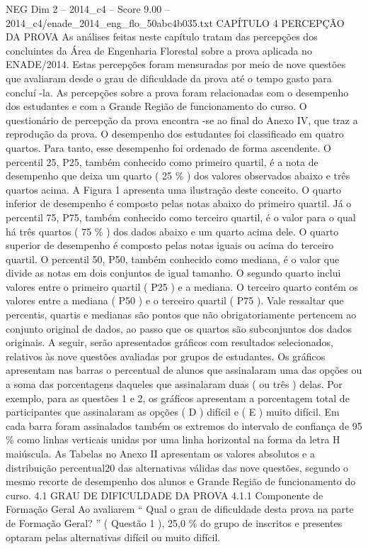 \begin{textsample}{NEG Dim 2 – 2014\_c4 – Score 9.00 – 2014\_c4/enade\_2014\_eng\_flo\_50abc4b035.txt}  \label{ex:f2_neg_317}
CAPÍTULO 4 PERCEPÇÃO DA PROVA As análises feitas neste capítulo tratam das percepções dos concluintes da Área de Engenharia Florestal sobre a prova aplicada no ENADE/2014.
Estas percepções foram mensuradas por meio de nove questões que avaliaram desde o grau de dificuldade da prova até o tempo gasto para concluí -la.
As percepções sobre a prova foram relacionadas com o desempenho dos estudantes e com a Grande Região de funcionamento do curso.
O questionário de percepção da prova encontra -se ao final do Anexo IV, que traz a reprodução da prova.
O desempenho dos estudantes foi classificado em quatro quartos.
Para tanto, esse desempenho foi ordenado de forma ascendente.
O percentil 25, P25, também conhecido como primeiro quartil, é a nota de desempenho que deixa um quarto ( 25 \% ) dos valores observados abaixo e três quartos acima.
A Figura 1 apresenta uma ilustração deste conceito.
O quarto inferior de desempenho é composto pelas notas abaixo do primeiro quartil.
Já o percentil 75, P75, também conhecido como terceiro quartil, é o valor para o qual há três quartos ( 75 \% ) dos dados abaixo e um quarto acima dele.
O quarto superior de desempenho é composto pelas notas iguais ou acima do terceiro quartil.
O percentil 50, P50, também conhecido como mediana, é o valor que divide as notas em dois conjuntos de igual tamanho.
O segundo quarto inclui valores entre o primeiro quartil ( P25 ) e a mediana.
O terceiro quarto contém os valores entre a mediana ( P50 ) e o terceiro quartil ( P75 ).
Vale ressaltar que percentis, quartis e medianas são pontos que não obrigatoriamente pertencem ao conjunto original de dados, ao passo que os quartos são subconjuntos dos dados originais.
A seguir, serão apresentados gráficos com resultados selecionados, relativos às nove questões avaliadas por grupos de estudantes.
Os gráficos apresentam nas barras o percentual de alunos que assinalaram uma das opções ou a soma das porcentagens daqueles que assinalaram duas ( ou três ) delas.
Por exemplo, para as questões 1 e 2, os gráficos apresentam a porcentagem total de participantes que assinalaram as opções ( D ) difícil e ( E ) muito difícil.
Em cada barra foram assinalados também os extremos do intervalo de confiança de 95 \% como linhas verticais unidas por uma linha horizontal na forma da letra H maiúscula.
As Tabelas no Anexo II apresentam os valores absolutos e a distribuição percentual20 das alternativas válidas das nove questões, segundo o mesmo recorte de desempenho dos alunos e Grande Região de funcionamento do curso. 4.1 GRAU DE DIFICULDADE DA PROVA 4.1.1 Componente de Formação Geral Ao avaliarem “ Qual o grau de dificuldade desta prova na parte de Formação Geral? ” ( Questão 1 ), 25,0 \% do grupo de inscritos e presentes optaram pelas alternativas difícil ou muito difícil.

\end{textsample}
